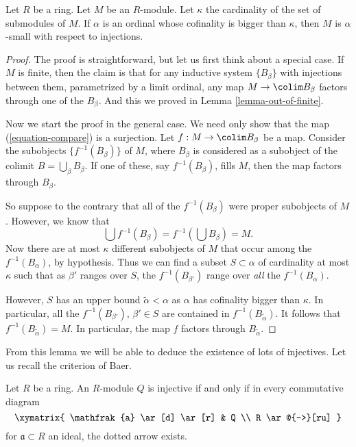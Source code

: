 \begin{proposition}
\label{proposition-modules-are-small}
Let $R$ be a ring. Let $M$ be an $R$-module.
Let $\kappa$ the cardinality of the set of submodules of $M$.
If $\alpha$ is an ordinal whose cofinality is bigger than $\kappa$,
then $M$ is $\alpha$-small with respect to injections.
\end{proposition}

\begin{proof}
The proof is straightforward, but let us first think about a special case.
If $M$ is finite, then the claim is that for any inductive system
$\{B_\beta\}$ with injections between them, parametrized by a
limit ordinal, any map $M \to \colim B_\beta$ factors through one of
the $B_\beta$. And this we proved in
Lemma \ref{lemma-out-of-finite}.

\medskip\noindent
Now we start the proof in the general case.
We need only show that the map (\ref{equation-compare}) is a surjection.
Let $f : M \to \colim B_\beta$ be a map.
Consider the subobjects $\{f^{-1}(B_\beta)\}$ of $M$, where $B_\beta$
is considered as a subobject of the colimit $B = \bigcup_\beta B_\beta$.
If one of these, say $f^{-1}(B_\beta)$, fills $M$,
then the map factors through $B_\beta$.

\medskip\noindent
So suppose to the contrary that all of the $f^{-1}(B_\beta)$ were proper
subobjects of $M$. However, we know that
$$
\bigcup f^{-1}(B_\beta) = f^{-1}\left(\bigcup B_\beta\right) = M.
$$
Now there are at most $\kappa$ different subobjects of $M$ that occur among
the $f^{-1}(B_\alpha)$, by hypothesis.
Thus we can find a subset $S \subset \alpha$ of cardinality at most
$\kappa$ such that as $\beta'$ ranges over $S$, the
$f^{-1}(B_{\beta'})$ range over \emph{all} the $f^{-1}(B_\alpha)$.

\medskip\noindent
However, $S$ has an upper bound $\widetilde{\alpha} < \alpha$ as
$\alpha$ has cofinality bigger than $\kappa$. In particular, all the
$f^{-1}(B_{\beta'})$, $\beta' \in S$ are contained in
$f^{-1}(B_{\widetilde{\alpha}})$.
It follows that $f^{-1}(B_{\widetilde{\alpha}}) = M$.
In particular, the map $f$ factors through $B_{\widetilde{\alpha}}$.
\end{proof}

\noindent
From this lemma we will be able to deduce the existence of lots of injectives.
Let us recall the criterion of Baer.

\begin{lemma}
\label{lemma-criterion-baer}
Let $R$ be a ring. An $R$-module $Q$ is injective if and only if in every
commutative diagram
$$
\xymatrix{
\mathfrak{a} \ar[d] \ar[r] &  Q \\
R \ar@{-->}[ru]
}
$$
for $\mathfrak{a} \subset R$ an ideal, the dotted arrow exists.
\end{lemma}

